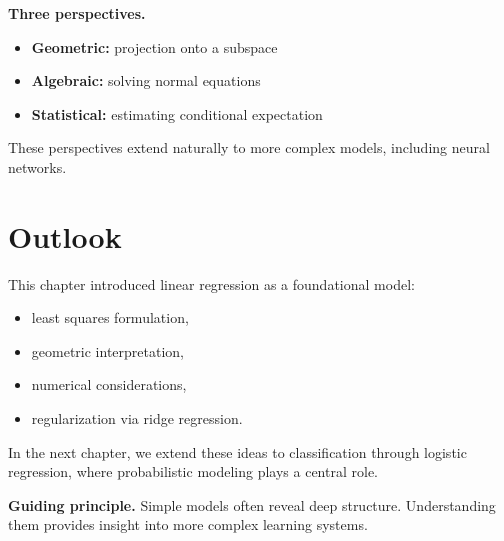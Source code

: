 \medskip

\noindent
\textbf{Three perspectives.}
\begin{itemize}
    \item \textbf{Geometric:} projection onto a subspace
    \item \textbf{Algebraic:} solving normal equations
    \item \textbf{Statistical:} estimating conditional expectation
\end{itemize}

\medskip

\noindent
These perspectives extend naturally to more complex models, including neural networks.

\section{Outlook}

This chapter introduced linear regression as a foundational model:
\begin{itemize}
    \item least squares formulation,
    \item geometric interpretation,
    \item numerical considerations,
    \item regularization via ridge regression.
\end{itemize}

\medskip

In the next chapter, we extend these ideas to classification through logistic regression, where probabilistic modeling plays a central role.

\medskip

\noindent
\textbf{Guiding principle.}  
Simple models often reveal deep structure. Understanding them provides insight into more complex learning systems.